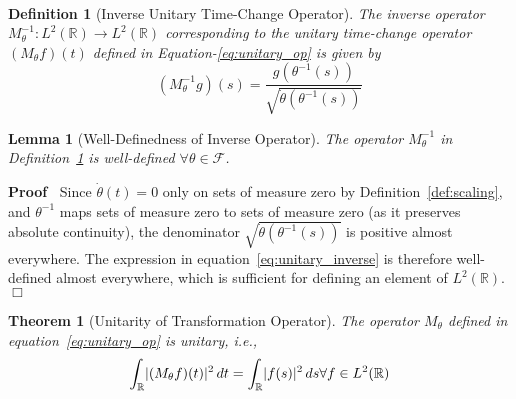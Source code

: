 \documentclass{article}
\newenvironment{proof}{\noindent\textbf{Proof\ }}{\hspace*{\fill}$\Box$\medskip}
\newtheorem{definition}{Definition}
\newtheorem{lemma}{Lemma}
{\theorembodyfont{\rmfamily}\newtheorem{remark}{Remark}}
\newtheorem{theorem}{Theorem}
\begin{document}
\

\begin{definition}
  [Inverse Unitary Time-Change Operator]\label{def:inverse_unitary_op} The
  inverse operator $M_{\theta}^{- 1} : L^2 (\mathbb{R}) \to L^2 (\mathbb{R})$
  corresponding to the unitary time-change operator $(M_{\theta} f) (t)$
  defined in Equation-\ref{eq:unitary_op} is given by
  \begin{equation}
    \label{eq:unitary_inverse} (M_{\theta}^{- 1} g) (s) = \frac{g (\theta^{-
    1} (s))}{\sqrt{\dot{\theta} (\theta^{- 1} (s))}}
  \end{equation}
\end{definition}

\begin{lemma}
  [Well-Definedness of Inverse Operator]\label{lem:inverse_well_defined} The
  operator $M_{\theta}^{- 1}$ in Definition~\ref{def:inverse_unitary_op} is
  well-defined $\forall \theta \in \mathcal{F}$.
\end{lemma}

\begin{proof}
  Since $\dot{\theta} (t) = 0$ only on sets of measure zero by
  Definition~\ref{def:scaling}, and $\theta^{- 1}$ maps sets of measure zero
  to sets of measure zero (as it preserves absolute continuity), the
  denominator $\sqrt{\dot{\theta} (\theta^{- 1} (s))}$ is positive almost
  everywhere. The expression in equation~\eqref{eq:unitary_inverse} is
  therefore well-defined almost everywhere, which is sufficient for defining
  an element of $L^2 (\mathbb{R})$.
\end{proof}

\begin{theorem}
  [Unitarity of Transformation Operator]\label{thm:unitary} The operator
  $M_{\theta}$ defined in equation~\eqref{eq:unitary_op} is unitary, i.e.,
  \begin{equation}
    \label{eq:L2_preserve} \int_{\mathbb{R}} \lvert (M_{\theta} f) (t)
    \rvert^2  \hspace{0.17em} dt = \int_{\mathbb{R}} \lvert f (s) \rvert^2 
    \hspace{0.17em} ds \forall f \in L^2 (\mathbb{R})
  \end{equation}
\end{theorem}
\end{document}
